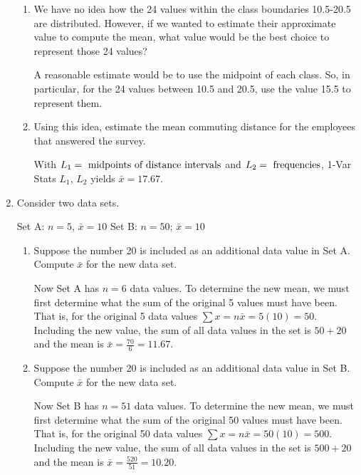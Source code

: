 \documentclass{article}
\newcommand{\answer}[1]{\color{red}#1}
\begin{document}
\begin{enumerate}
	\begin{enumerate}
	\item We have no idea how the 24 values within the class boundaries 10.5-20.5 are distributed.  However, if we wanted to estimate their approximate value to compute the mean, what value would be the best choice to represent those 24 values?
	
	{\answer{A reasonable estimate would be to use the midpoint of each class.  So, in particular, for the 24 values between 10.5 and 20.5, use the value 15.5 to represent them.}} 
	
	\item Using this idea, estimate the mean commuting distance for the employees that answered the survey.

	{\answer{With $L_1 = \textnormal{ midpoints of distance intervals}$ and $L_2 = \textnormal{ frequencies}$,
	1-Var Stats $L_1$, $L_2$ yields $\bar{x} = 17.67$.}} 

	\end{enumerate}

\item Consider two data sets.
\begin{center} 
Set A: $n=5$, $\bar{x} =10$ \hspace{2.0in} Set B: $n=50$; $\bar{x}=10$ 
\end{center}
	\begin{enumerate}
	\item Suppose the number 20 is included as an additional data value in Set A.  Compute $\bar{x}$ for the new data set. 
	
	{\answer{Now Set A has $n=6$ data values.  To determine the new mean, we must first determine what the sum of the original 5 values must have been.  That is, for the original 5 data values $\sum x = n\bar{x} = 5(10) = 50$.  Including the new value, the sum of all data values in the set is $50 + 20$ and the mean is $\bar{x} = \frac{70}{6} = 11.67$. }} 
	
	\item Suppose the number 20 is included as an additional data value in Set B.  Compute $\bar{x}$ for the new data set. 
	
	{\answer{Now Set B has $n=51$ data values.  To determine the new mean, we must first determine what the sum of the original 50 values must have been.  That is, for the original 50 data values $\sum x = n\bar{x} = 50(10) = 500$.  Including the new value, the sum of all data values in the set is $500 + 20$ and the mean is $\bar{x} = \frac{520}{51} = 10.20$. }} 
	

\end{enumerate}
\end{enumerate}
\end{document}
